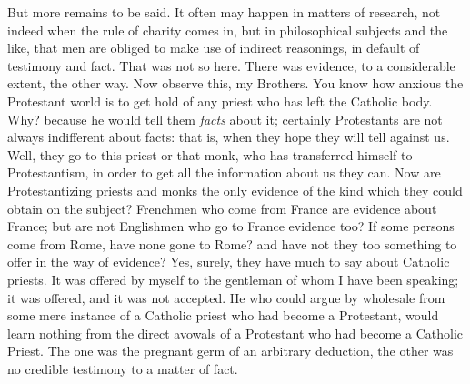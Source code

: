 But more remains to be said. It often may happen in
matters of research, not indeed when the rule of charity
comes in, but in philosophical subjects and the like,
that men are obliged to make use of indirect reasonings,
in default of testimony and fact. That was not so here.
There was evidence, to a considerable extent, the other
way. Now observe this, my Brothers. You know how anxious
the Protestant world is to get hold of any priest who has
left the Catholic body. Why? because he would tell them \emph{facts}
about it; certainly Protestants are not always
indifferent about facts: that is, when they hope they
will tell against us. Well, they go to this priest or
that monk, who has transferred himself to Protestantism,
in order to get all the information about us they can.
Now are Protestantizing priests and monks the only
evidence of the kind which they could obtain on the
subject? Frenchmen who come from France are evidence
about France; but are not Englishmen who go to France
evidence too? If some persons come from Rome, have none
gone to Rome? and have not they too something to offer in
the way of evidence? Yes, surely, they have much to say
about Catholic priests. It was offered by myself to the
gentleman of whom I have been speaking; it was offered,
and it was not accepted. He who could argue by wholesale
from some mere instance of a Catholic priest who had
become a Protestant, would learn nothing from the direct
avowals of a Protestant who had become a Catholic Priest.
The one was the pregnant germ of an arbitrary deduction,
the other was no credible testimony to a matter of fact.

